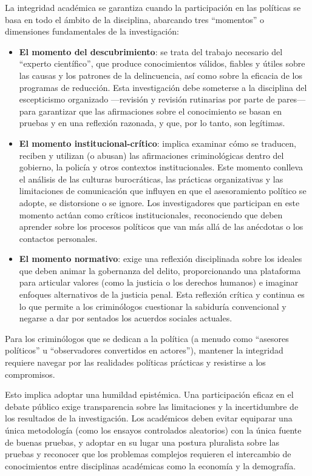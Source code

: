 \documentclass[
  spanish,
  letterpaper,
  DIV=11,
  numbers=noendperiod]{scrreprt}
\begin{document}
La integridad académica se garantiza cuando la participación en las
políticas se basa en todo el ámbito de la disciplina, abarcando tres
``momentos'' o dimensiones fundamentales de la investigación:

\begin{itemize}
\item
  \textbf{El momento del descubrimiento}: se trata del trabajo necesario
  del ``experto científico'', que produce conocimientos válidos, fiables
  y útiles sobre las causas y los patrones de la delincuencia, así como
  sobre la eficacia de los programas de reducción. Esta investigación
  debe someterse a la disciplina del escepticismo organizado ---revisión
  y revisión rutinarias por parte de pares--- para garantizar que las
  afirmaciones sobre el conocimiento se basan en pruebas y en una
  reflexión razonada, y que, por lo tanto, son legítimas.
\item
  \textbf{El momento institucional-crítico}: implica examinar cómo se
  traducen, reciben y utilizan (o abusan) las afirmaciones
  criminológicas dentro del gobierno, la policía y otros contextos
  institucionales. Este momento conlleva el análisis de las culturas
  burocráticas, las prácticas organizativas y las limitaciones de
  comunicación que influyen en que el asesoramiento político se adopte,
  se distorsione o se ignore. Los investigadores que participan en este
  momento actúan como críticos institucionales, reconociendo que deben
  aprender sobre los procesos políticos que van más allá de las
  anécdotas o los contactos personales.
\item
  \textbf{El momento normativo}: exige una reflexión disciplinada sobre
  los ideales que deben animar la gobernanza del delito, proporcionando
  una plataforma para articular valores (como la justicia o los derechos
  humanos) e imaginar enfoques alternativos de la justicia penal. Esta
  reflexión crítica y continua es lo que permite a los criminólogos
  cuestionar la sabiduría convencional y negarse a dar por sentados los
  acuerdos sociales actuales.
\end{itemize}

Para los criminólogos que se dedican a la política (a menudo como
``asesores políticos'' u ``observadores convertidos en actores''),
mantener la integridad requiere navegar por las realidades políticas
prácticas y resistirse a los compromisos.

Esto implica adoptar una humildad epistémica. Una participación eficaz
en el debate público exige transparencia sobre las limitaciones y la
incertidumbre de los resultados de la investigación. Los académicos
deben evitar equiparar una única metodología (como los ensayos
controlados aleatorios) con la única fuente de buenas pruebas, y adoptar
en su lugar una postura pluralista sobre las pruebas y reconocer que los
problemas complejos requieren el intercambio de conocimientos entre
disciplinas académicas como la economía y la demografía.
\end{document}
